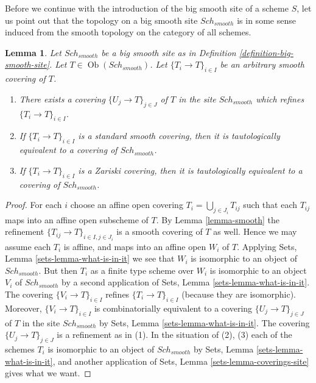\documentclass{stacks-project}
\theoremstyle{plain}
\newtheorem{lemma}[subsection]{Lemma}
\theoremstyle{definition}
\theoremstyle{remark}
\numberwithin{equation}{subsection}
\def\Sch{\mathit{Sch}}
\def\Ob{\mathop{\mathrm{Ob}}\nolimits}
\begin{document}
\medskip\noindent
Before we continue with the introduction of the big smooth site of
a scheme $S$, let us point out that the topology on a big smooth site
$\Sch_{smooth}$ is in some sense induced from the smooth topology
on the category of all schemes.

\begin{lemma}
\label{lemma-smooth-induced}
Let $\Sch_{smooth}$ be a big smooth site as in
Definition \ref{definition-big-smooth-site}.
Let $T \in \Ob(\Sch_{smooth})$.
Let $\{T_i \to T\}_{i \in I}$ be an arbitrary smooth covering of $T$.
\begin{enumerate}
\item There exists a covering $\{U_j \to T\}_{j \in J}$ of $T$ in the site
$\Sch_{smooth}$ which refines $\{T_i \to T\}_{i \in I}$.
\item If $\{T_i \to T\}_{i \in I}$ is a standard smooth covering, then
it is tautologically equivalent to a covering of $\Sch_{smooth}$.
\item If $\{T_i \to T\}_{i \in I}$ is a Zariski covering, then
it is tautologically equivalent to a covering of $\Sch_{smooth}$.
\end{enumerate}
\end{lemma}

\begin{proof}
For each $i$ choose an affine open covering $T_i = \bigcup_{j \in J_i} T_{ij}$
such that each $T_{ij}$ maps into an affine open subscheme of $T$. By
Lemma \ref{lemma-smooth}
the refinement $\{T_{ij} \to T\}_{i \in I, j \in J_i}$ is a smooth covering
of $T$ as well. Hence we may assume each $T_i$ is affine, and maps into
an affine open $W_i$ of $T$. Applying
Sets, Lemma \ref{sets-lemma-what-is-in-it}
we see that $W_i$ is isomorphic to an object of $\Sch_{smooth}$.
But then $T_i$ as a finite type scheme over $W_i$
is isomorphic to an object $V_i$ of $\Sch_{smooth}$ by a second
application of
Sets, Lemma \ref{sets-lemma-what-is-in-it}.
The covering $\{V_i \to T\}_{i \in I}$ refines $\{T_i \to T\}_{i \in I}$
(because they are isomorphic).
Moreover, $\{V_i \to T\}_{i \in I}$ is combinatorially equivalent to a
covering $\{U_j \to T\}_{j \in J}$ of $T$ in the site
$\Sch_{smooth}$ by
Sets, Lemma \ref{sets-lemma-what-is-in-it}.
The covering $\{U_j \to T\}_{j \in J}$ is a refinement as in (1).
In the situation of (2), (3) each of the
schemes $T_i$ is isomorphic to an object of $\Sch_{smooth}$ by
Sets, Lemma \ref{sets-lemma-what-is-in-it},
and another application of
Sets, Lemma \ref{sets-lemma-coverings-site}
gives what we want.
\end{proof}
\end{document}
